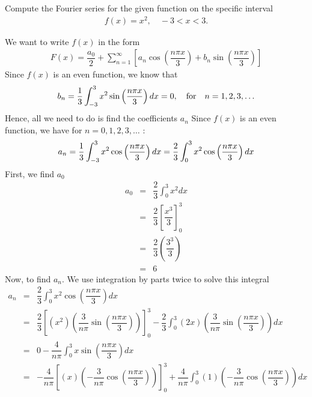 \documentclass[11pt]{article}
\begin{document}
\begin{problem}
Compute the Fourier series for the given function on the specific interval
\begin{eqnarray*}
f(x) = x^2 , \quad -3<x<3.
\end{eqnarray*}
\end{problem}
\begin{solution}
We want to write $f(x)$ in the form
\begin{eqnarray*}
F(x) = \dfrac{a_{0}}{2} + \sum_{n=1}^{\infty} \left[ a_{n}\cos\left(\dfrac{n\pi x}{3}\right)+b_{n}\sin\left(\dfrac{n\pi x}{3}\right) \right]
\end{eqnarray*}
Since $f(x)$ is an even function, we know that
\begin{eqnarray*}
b_{n} = \dfrac{1}{3} \int_{-3}^{3} x^2\sin\left(\dfrac{n\pi x}{3}\right) dx =0, \quad {\rm for} \quad n =1,2,3,\ldots
\end{eqnarray*}
Hence, all we need to do is find the coefficients $a_{n}$ Since $f(x)$ is an even function, we have for $n =0,1,2,3,\ldots$ :
\begin{equation*}
a_{n} = \dfrac{1}{3} \int_{-3}^{3} x^2\cos\left(\dfrac{n\pi x}{3}\right) dx = \dfrac{2}{3} \int_{0}^{3} x^2\cos\left(\dfrac{n\pi x}{3}\right) dx \\
\end{equation*}
First, we find $a_{0}$
\begin{eqnarray*}
a_{0} & = & \dfrac{2}{3}  \int_{0}^{3} x^2 dx \\
& = & \dfrac{2}{3}  \left[\dfrac{x^3}{3}\right]_{0}^{3} \\
& = &\dfrac{2}{3} \left( \dfrac{3^3}{3} \right)\\
& = & 6
\end{eqnarray*}
Now, to find $a_{n}$. We use integration by parts twice to solve this integral
\begin{eqnarray*}
a_{n} & = & \dfrac{2}{3}\int_{0}^{3} x^2\cos\left(\dfrac{n\pi x}{3}\right) dx \\
& = &  \dfrac{2}{3}\left[(x^2)\left(\dfrac{3}{n\pi} \sin\left(\dfrac{n\pi x}{3}\right)\right) \right]_{0}^{3} - \dfrac{2}{3} \int_{0}^{3} (2x)\left(\dfrac{3}{n\pi} \sin\left(\dfrac{n\pi x}{3}\right)\right) dx \\
& = &  0 - \dfrac{4}{n\pi} \int_{0}^{3} x \sin\left(\dfrac{n\pi x}{3}\right) dx \\
& = &   -\dfrac{4}{n\pi} \left[ (x) \left(-\dfrac{3}{n\pi} \cos\left(\dfrac{n\pi x}{3}\right)\right) \right]_{0}^{3} + \dfrac{4}{n\pi} \int_{0}^{3} (1) \left(-\dfrac{3}{n\pi} \cos\left(\dfrac{n\pi x}{3}\right)\right) dx \\

\end{eqnarray*}
\end{solution}
\end{document}
